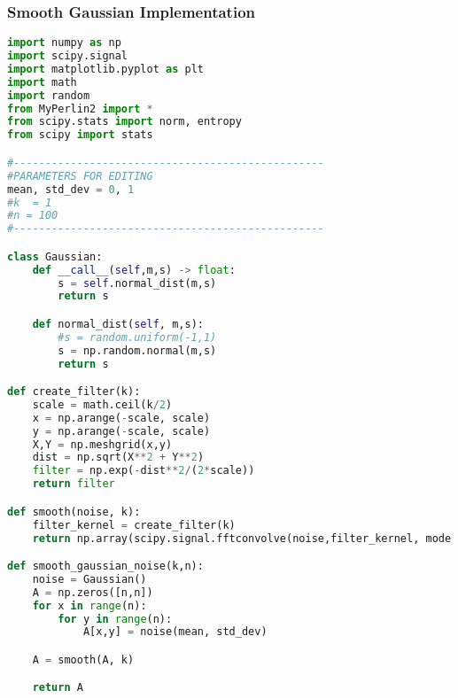 \documentclass[11pt,a4paper]{article}
\begin{document}
\subsubsection{Smooth Gaussian Implementation}
\begin{lstlisting}[language=Python, mathescape=true]
import numpy as np
import scipy.signal
import matplotlib.pyplot as plt
import math
import random
from MyPerlin2 import *
from scipy.stats import norm, entropy
from scipy import stats

#-------------------------------------------------
#PARAMETERS FOR EDITING
mean, std_dev = 0, 1
#k  = 1
#n = 100
#-------------------------------------------------

class Gaussian:
    def __call__(self,m,s) -> float:
        s = self.normal_dist(m,s)
        return s

    def normal_dist(self, m,s):
        #s = random.uniform(-1,1)
        s = np.random.normal(m,s)
        return s

def create_filter(k):
    scale = math.ceil(k/2)
    x = np.arange(-scale, scale)
    y = np.arange(-scale, scale)
    X,Y = np.meshgrid(x,y)
    dist = np.sqrt(X**2 + Y**2)
    filter = np.exp(-dist**2/(2*scale))
    return filter

def smooth(noise, k):
    filter_kernel = create_filter(k)
    return np.array(scipy.signal.fftconvolve(noise,filter_kernel, mode = 'same'))

def smooth_gaussian_noise(k,n):
    noise = Gaussian()
    A = np.zeros([n,n])
    for x in range(n):
        for y in range(n):
            A[x,y] = noise(mean, std_dev)

    A = smooth(A, k)

    return A
\end{lstlisting}
\end{document}
